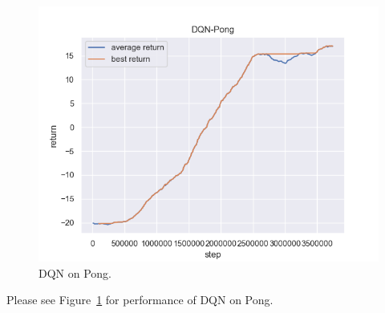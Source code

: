 \begin{figure}[htbp]
    \centering
    \includegraphics[width=0.5\linewidth]{figures/q1.png}
    \caption{DQN on Pong.}
    \label{fig:q1}
\end{figure}

Please see Figure~\ref{fig:q1} for performance of DQN on Pong.